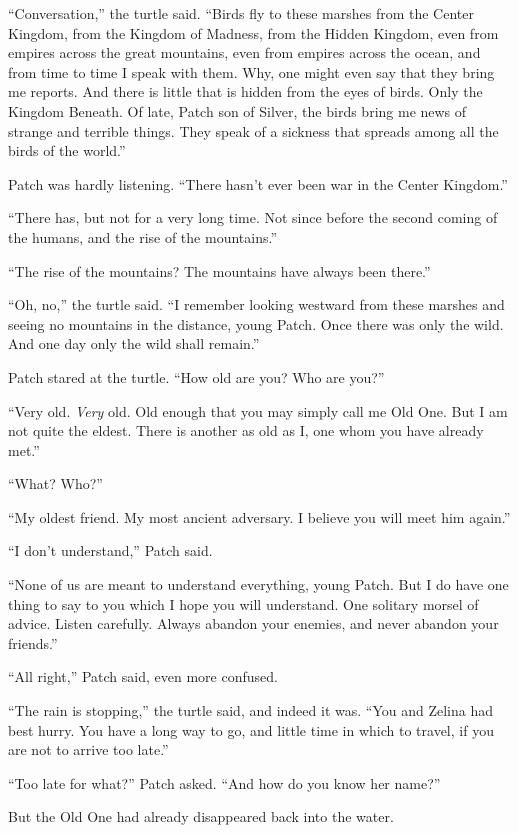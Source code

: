 \documentclass[12pt]{memoir}
\begin{document}
“Conversation,” the turtle said. “Birds fly to these marshes from the
Center Kingdom, from the Kingdom of Madness, from the Hidden Kingdom,
even from empires across the great mountains, even from empires across
the ocean, and from time to time I speak with them. Why, one might
even say that they bring me reports. And there is little that is
hidden from the eyes of birds. Only the Kingdom Beneath. Of late,
Patch son of Silver, the birds bring me news of strange and terrible
things. They speak of a sickness that spreads among all the birds of
the world.”

Patch was hardly listening. “There hasn’t ever been war in the Center
Kingdom.”

“There has, but not for a very long time. Not since before the second
coming of the humans, and the rise of the mountains.”

“The rise of the mountains? The mountains have always been there.”

“Oh, no,” the turtle said. “I remember looking westward from these
marshes and seeing no mountains in the distance, young Patch. Once
there was only the wild. And one day only the wild shall remain.”

Patch stared at the turtle. “How old are you? Who are you?”

“Very old. \textit{Very} old. Old enough that you may simply call me
Old One. But I am not quite the eldest. There is another as old as I,
one whom you have already met.”

“What? Who?”

“My oldest friend. My most ancient adversary. I believe you will meet
him again.”

“I don’t understand,” Patch said.

“None of us are meant to understand everything, young Patch. But I do
have one thing to say to you which I hope you will understand. One
solitary morsel of advice. Listen carefully. Always abandon your
enemies, and never abandon your friends.”

“All right,” Patch said, even more confused.

“The rain is stopping,” the turtle said, and indeed it was. “You and
Zelina had best hurry. You have a long way to go, and little time in
which to travel, if you are not to arrive too late.”

“Too late for what?” Patch asked. “And how do you know her name?”

But the Old One had already disappeared back into the water.
\end{document}
